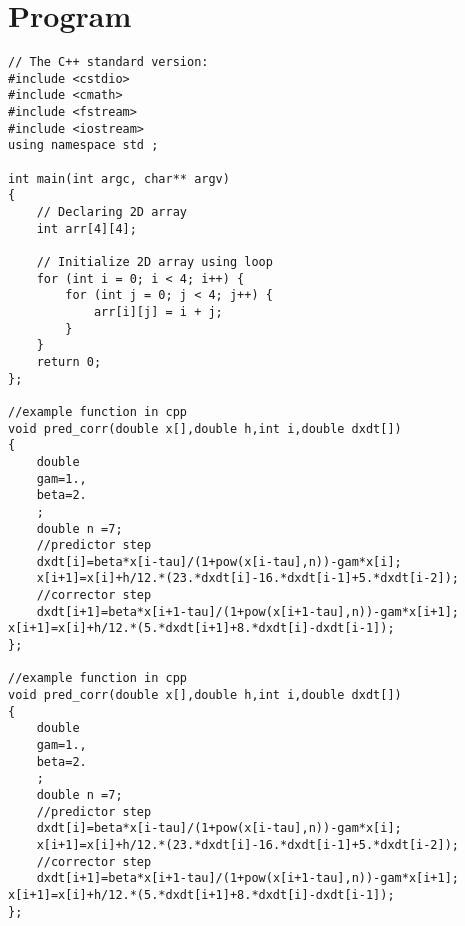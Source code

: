 \documentclass[10pt,fleqn,reqno,a4paper]{article}
\begin{document}
\section{Program}
\begin{verbatim}
// The C++ standard version:
#include <cstdio>
#include <cmath>
#include <fstream>
#include <iostream>
using namespace std ;

int main(int argc, char** argv)
{
	// Declaring 2D array
	int arr[4][4];

	// Initialize 2D array using loop
	for (int i = 0; i < 4; i++) {
		for (int j = 0; j < 4; j++) {
			arr[i][j] = i + j;
		}
	}
	return 0;
};

//example function in cpp
void pred_corr(double x[],double h,int i,double dxdt[])
{
	double
	gam=1.,
	beta=2.
	;
	double n =7;
	//predictor step
	dxdt[i]=beta*x[i-tau]/(1+pow(x[i-tau],n))-gam*x[i];
	x[i+1]=x[i]+h/12.*(23.*dxdt[i]-16.*dxdt[i-1]+5.*dxdt[i-2]);
	//corrector step
	dxdt[i+1]=beta*x[i+1-tau]/(1+pow(x[i+1-tau],n))-gam*x[i+1]; x[i+1]=x[i]+h/12.*(5.*dxdt[i+1]+8.*dxdt[i]-dxdt[i-1]);
};

//example function in cpp
void pred_corr(double x[],double h,int i,double dxdt[])
{
	double
	gam=1.,
	beta=2.
	;
	double n =7;
	//predictor step
	dxdt[i]=beta*x[i-tau]/(1+pow(x[i-tau],n))-gam*x[i];
	x[i+1]=x[i]+h/12.*(23.*dxdt[i]-16.*dxdt[i-1]+5.*dxdt[i-2]);
	//corrector step
	dxdt[i+1]=beta*x[i+1-tau]/(1+pow(x[i+1-tau],n))-gam*x[i+1]; x[i+1]=x[i]+h/12.*(5.*dxdt[i+1]+8.*dxdt[i]-dxdt[i-1]);
};
\end{verbatim}
\end{document}
